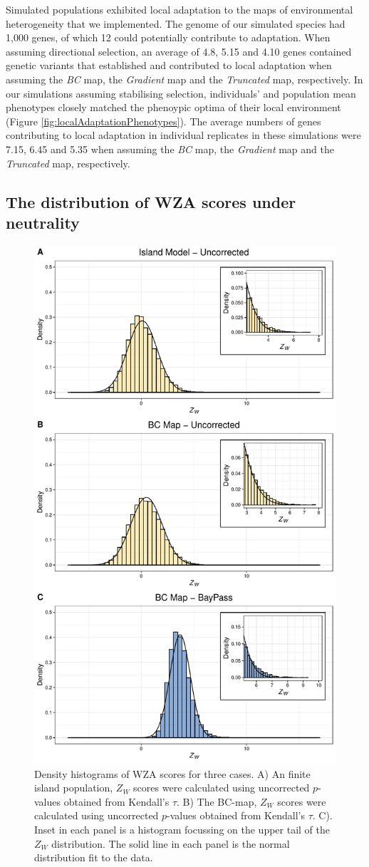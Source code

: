 \documentclass[10pt,twoside,lineno, twocolumn]{GSA_format}
\begin{document}
Simulated populations exhibited local adaptation to the maps of environmental heterogeneity that we implemented. The genome of our simulated species had 1,000 genes, of which 12 could potentially contribute to adaptation. When assuming directional selection, an average of 4.8, 5.15 and 4.10 genes contained genetic variants that established and contributed to local adaptation when assuming the \textit{BC} map, the \textit{Gradient} map and the \textit{Truncated} map, respectively. In our simulations assuming stabilising selection, individuals' and population mean phenotypes closely matched the phenoypic optima of their local environment (Figure \ref{fig:localAdaptationPhenotypes}). The average numbers of genes contributing to local adaptation in individual replicates in these simulations were 7.15, 6.45 and 5.35 when assuming the \textit{BC} map, the \textit{Gradient} map and the \textit{Truncated} map, respectively.\\

\subsection{The distribution of WZA scores under neutrality}

\begin{figure}
  \includegraphics[height=0.5\linewidth,keepaspectratio]{Plots/neutralResults_histogram.pdf} 

  \caption{Density histograms of WZA scores for three cases. A) An finite island population, $Z_W$ scores were calculated using uncorrected $p$-values obtained from Kendall's $\tau$. B)  The BC-map, $Z_W$ scores were calculated using uncorrected $p$-values obtained from Kendall's $\tau$. C). Inset in each panel is a histogram focussing on the upper tail of the $Z_W$ distribution. The solid line in each panel is the normal distribution fit to the data.}
  
  \label{fig:NeutralHistograms}
\end{figure}
\end{document}
